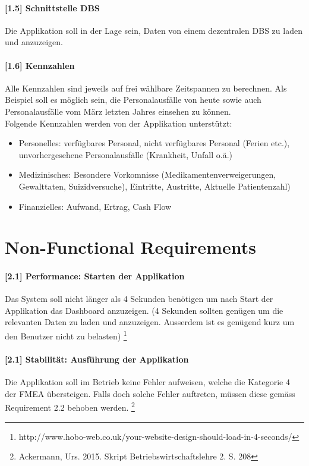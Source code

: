 \documentclass[a4paper]{scrreprt}
\begin{document}
\paragraph{[1.5] Schnittstelle DBS}
Die Applikation soll in der Lage sein, Daten von einem dezentralen DBS zu laden und anzuzeigen. 

\paragraph{[1.6] Kennzahlen}
Alle Kennzahlen sind jeweils auf frei wählbare Zeitspannen zu berechnen. Als Beispiel soll es möglich sein, die Personalausfälle von heute sowie auch Personalausfälle vom März letzten Jahres einsehen zu können. \\
Folgende Kennzahlen werden von der Applikation unterstützt:
\begin{itemize}
\item Personelles: verfügbares Personal, nicht verfügbares Personal (Ferien etc.), unvorhergesehene Personalausfälle (Krankheit, Unfall o.ä.)
\item Medizinisches: Besondere Vorkomnisse (Medikamentenverweigerungen, Gewalttaten, Suizidversuche), Eintritte, Austritte, Aktuelle Patientenzahl)
\item Finanzielles: Aufwand, Ertrag, Cash Flow
\end{itemize}

\section{Non-Functional Requirements}
\paragraph{[2.1] Performance: Starten der Applikation}
Das System soll nicht länger als 4 Sekunden benötigen um nach Start der Applikation das Dashboard anzuzeigen. (4 Sekunden sollten genügen um die relevanten Daten zu laden und anzuzeigen. Ausserdem ist es genügend kurz um den Benutzer nicht zu belasten)
\footnote{http://www.hobo-web.co.uk/your-website-design-should-load-in-4-seconds/}

\paragraph{[2.1] Stabilität: Ausführung der Applikation}
Die Applikation soll im Betrieb keine Fehler aufweisen, welche die Kategorie 4 der FMEA übersteigen. Falls doch solche Fehler auftreten, müssen diese gemäss Requirement 2.2 behoben werden. 
\footnote{Ackermann, Urs. 2015. Skript Betriebswirtschaftslehre 2. S. 208}
\end{document}
